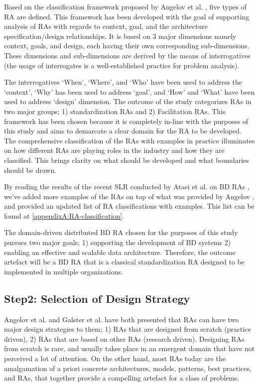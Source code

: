 \documentclass{bmcart}
\begin{document}
Based on the classification framework proposed by Angelov et al. \cite{angelov2009classification}, five types of RA are defined. This framework has been developed with the goal of supporting analysis of RAs with regards to context, goal, and the architecture specification/design relationships. It is based on 3 major dimensions namely context, goals, and design, each having their own corresponding sub-dimensions. These dimensions and sub-dimensions are derived by the means of interrogatives (the usage of interrogates is a well-established practice for problem analysis).

The interrogatives ‘When’, ‘Where’, and ‘Who’ have been used to address the ‘context’, ‘Why’ has been used to address ‘goal’, and ‘How’ and ‘What’ have been used to address ‘design’ dimension. The outcome of the study categorizes RAs in two major groups; 1) standardization RAs and 2) Facilitation RAs. This framework has been chosen because it is completely in-line with the purposes of this study and aims to demarcate a clear domain for the RA to be developed. The comprehensive classification of the RAs with examples in practice illuminates on how different RAs are playing roles in the industry and how they are classified. This brings clarity on what should be developed and what boundaries should be drawn.

By reading the results of the recent SLR conducted by Ataei et al. on BD RAs \cite{AtaeiACIS}, we've added more examples of the RAs on top of what was provided by Angelov \cite{angelov2009classification}, and provided an updated list of RA classifications with examples. This list can be found at \ref{appendixA:RA-classification}.

The domain-driven distributed BD RA chosen for the purposes of this study pursues two major goals; 1) supporting the development of BD systems 2) enabling an effective and scalable data architecture. Therefore, the outcome artefact will be a BD RA that is a classical standardization RA designed to be implemented in multiple organizations.

\subsection{Step2: Selection of Design Strategy}

Angelov et al. \cite{angelov2008towards} and Galster et al.\cite{galster2011empirically} have both presented that RAs can have two major design strategies to them; 1) RAs that are designed from scratch (practice driven), 2) RAs that are based on other RAs (research driven). Designing RAs from scratch is rare, and usually takes place in an emergent domain that have not perceived a lot of attention. On the other hand, most RAs today are the amalgamation of a priori concrete architectures, models, patterns, best practices, and RAs, that together provide a compelling artefact for a class of problems.
\end{document}
